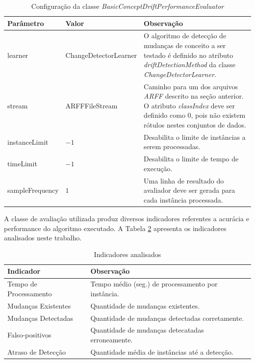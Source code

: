 \documentclass[qual, classic, a4paper]{ufbathesis}
\begin{document}
\begin{center} 
    \begin{table}[h]
    \caption{Configuração da classe \textit{BasicConceptDriftPerformanceEvaluator}}
    \label{tbl:configuracao_tarefa}
    \resizebox{\textwidth}{!} {%
    \begin{tabular}{llm{7.5cm}}
    \toprule
    Parâmetro & Valor & Observação \\
    \midrule
    learner          & ChangeDetectorLearner  &  O algoritmo de detecção de mudanças de conceito a ser testado é definido no atributo \textit{driftDetectionMethod} da classe \textit{ChangeDetectorLearner}.                   \\
    stream           & ARFFFileStream         &  Caminho para um dos arquivos \textit{ARFF} descrito na seção anterior. O atributo \textit{classIndex} deve ser definido como $0$, pois não existem rótulos nestes conjuntos de dados.  \\ 
    instanceLimit    & $-1$                            &  Desabilita o limite de instâncias a serem processadas.  \\
    timeLimit        & $-1$                            &  Desabilita o limite de tempo de execução.  \\ 
    sampleFrequency  & \hspace{3mm}$1$                 &  Uma linha de resultado do avaliador deve ser gerada para cada instância processada.  \\
    \bottomrule
    \end{tabular}
    }
    \end{table}
\end{center}

A classe de avaliação utilizada produz diversos indicadores referentes a acurácia e performance do algoritmo executado. 
A Tabela \ref{tbl:indicadores_analisado} apresenta os indicadores analisados neste trabalho.

\begin{center} 
    \begin{table}[h]
    \caption{Indicadores analisados}
    \label{tbl:indicadores_analisado}
    \resizebox{\textwidth}{!} {%
    \begin{tabular}{lm{10cm}}
    \toprule
    Indicador & Observação \\
    \midrule
    Tempo de Processamento    &  Tempo médio (seg.) de processamento por instância. \\
    Mudanças Existentes       &  Quantidade de mudanças existentes. \\
    Mudanças Detectadas       &  Quantidade de mudanças detectadas corretamente. \\
    Falso-positivos           &  Quantidade de mudanças detecatadas erroneamente. \\  
    Atraso de Detecção        &  Quantidade média de instâncias até a detecção. \\
    \bottomrule
    \end{tabular}
    }
    \end{table}
\end{center}
\end{document}
